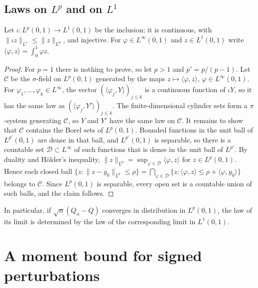 \documentclass[11pt]{amsart}
\newtheorem{lemma}[theorem]{Lemma}
\theoremstyle{remark}
\newcommand{\Lp}{L^p(0,1)}
\begin{document}
\subsection{\texorpdfstring{Laws on $L^p$ and on $L^1$}{Laws on Lp and on L1}}

Let $\iota:\Lp\to L^1(0,1)$ be the inclusion; it is continuous, with $\|\iota z\|_{L^1}\le\|z\|_{L^p}$, and injective. For $\varphi\in L^\infty(0,1)$ and $z\in L^1(0,1)$ write $\langle\varphi,z\rangle=\int_0^1\varphi z$.


\begin{proof}
For $p=1$ there is nothing to prove, so let $p>1$ and $p'=p/(p-1)$. Let $\mathcal C$ be the $\sigma$-field on $\Lp$ generated by the maps $z\mapsto\langle\varphi,z\rangle$, $\varphi\in L^\infty(0,1)$. For $\varphi_1,\dots,\varphi_k\in L^\infty$, the vector $(\langle\varphi_j,Y\rangle)_{j\le k}$ is a continuous function of $\iota Y$, so it has the same law as $(\langle\varphi_j,Y'\rangle)_{j\le k}$. The finite-dimensional cylinder sets form a $\pi$-system generating $\mathcal C$, so $Y$ and $Y'$ have the same law on $\mathcal C$. It remains to show that $\mathcal C$ contains the Borel sets of $\Lp$. Bounded functions in the unit ball of $L^{p'}(0,1)$ are dense in that ball, and $L^{p'}(0,1)$ is separable, so there is a countable set $\mathcal D\subset L^\infty$ of such functions that is dense in the unit ball of $L^{p'}$. By duality and H\"older's inequality, $\|z\|_{L^p}=\sup_{\varphi\in\mathcal D}\langle\varphi,z\rangle$ for $z\in\Lp$. Hence each closed ball $\{z:\|z-y_0\|_{L^p}\le\rho\}=\bigcap_{\varphi\in\mathcal D}\{z:\langle\varphi,z\rangle\le\rho+\langle\varphi,y_0\rangle\}$ belongs to $\mathcal C$. Since $\Lp$ is separable, every open set is a countable union of such balls, and the claim follows.
\end{proof}

In particular, if $\sqrt n(Q_n-Q)$ converges in distribution in $\Lp$, the law of its limit is determined by the law of the corresponding limit in $L^1(0,1)$.

\section{A moment bound for signed perturbations}\label{sec:signed}
\end{document}

